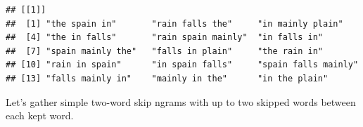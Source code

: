 \documentclass[]{book}
\newenvironment{Shaded}{\begin{snugshade}}{\end{snugshade}}
\newcommand{\KeywordTok}[1]{\textcolor[rgb]{0.13,0.29,0.53}{\textbf{{#1}}}}
\newcommand{\DataTypeTok}[1]{\textcolor[rgb]{0.13,0.29,0.53}{{#1}}}
\newcommand{\DecValTok}[1]{\textcolor[rgb]{0.00,0.00,0.81}{{#1}}}
\newcommand{\CharTok}[1]{\textcolor[rgb]{0.31,0.60,0.02}{{#1}}}
\newcommand{\StringTok}[1]{\textcolor[rgb]{0.31,0.60,0.02}{{#1}}}
\newcommand{\NormalTok}[1]{{#1}}
\theoremstyle{definition}
\theoremstyle{definition}
\theoremstyle{remark}
\begin{document}
\begin{verbatim}
## [[1]]
##  [1] "the spain in"       "rain falls the"     "in mainly plain"   
##  [4] "the in falls"       "rain spain mainly"  "in falls in"       
##  [7] "spain mainly the"   "falls in plain"     "the rain in"       
## [10] "rain in spain"      "in spain falls"     "spain falls mainly"
## [13] "falls mainly in"    "mainly in the"      "in the plain"
\end{verbatim}

Let's gather simple two-word skip ngrams with up to two skipped words
between each kept word.

\begin{Shaded}
\end{Shaded}
\end{document}
